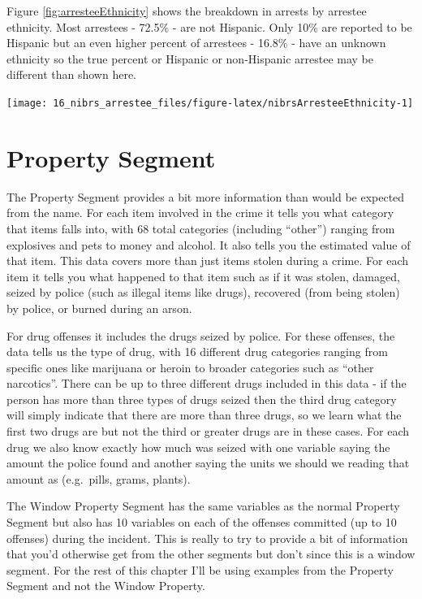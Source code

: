 \documentclass[
]{krantz}
\let\origfigure\figure
\let\endorigfigure\endfigure
\renewenvironment{figure}[1][2] {
    \expandafter\origfigure\expandafter[H]
} {
    \endorigfigure
}
\begin{document}
Figure \ref{fig:arresteeEthnicity} shows the breakdown in
arrests by arrestee ethnicity. Most arrestees - 72.5\% - are
not Hispanic. Only 10\% are reported to be Hispanic but an
even higher percent of arrestees - 16.8\% - have an unknown
ethnicity so the true percent or Hispanic or non-Hispanic
arrestee may be different than shown here.

\begin{figure}

{\centering \texttt{[image: 16\_nibrs\_arrestee\_files/figure-latex/nibrsArresteeEthnicity-1]} 

}

\caption{The share of arrestees by ethnicity, 1991-2023.}\label{fig:nibrsArresteeEthnicity}
\end{figure}

\chapter{Property Segment}\label{property}

The Property Segment provides a bit more information than
would be expected from the name. For each item involved in
the crime it tells you what category that items falls into,
with 68 total categories (including ``other'') ranging from
explosives and pets to money and alcohol. It also tells you
the estimated value of that item. This data covers more than
just items stolen during a crime. For each item it tells you
what happened to that item such as if it was stolen,
damaged, seized by police (such as illegal items like
drugs), recovered (from being stolen) by police, or burned
during an arson.

For drug offenses it includes the drugs seized by police.
For these offenses, the data tells us the type of drug, with
16 different drug categories ranging from specific ones like
marijuana or heroin to broader categories such as ``other
narcotics''. There can be up to three different drugs
included in this data - if the person has more than three
types of drugs seized then the third drug category will
simply indicate that there are more than three drugs, so we
learn what the first two drugs are but not the third or
greater drugs are in these cases. For each drug we also know
exactly how much was seized with one variable saying the
amount the police found and another saying the units we
should we reading that amount as (e.g.~pills, grams,
plants).

The Window Property Segment has the same variables as the
normal Property Segment but also has 10 variables on each of
the offenses committed (up to 10 offenses) during the
incident. This is really to try to provide a bit of
information that you'd otherwise get from the other segments
but don't since this is a window segment. For the rest of
this chapter I'll be using examples from the Property
Segment and not the Window Property.
\end{document}
